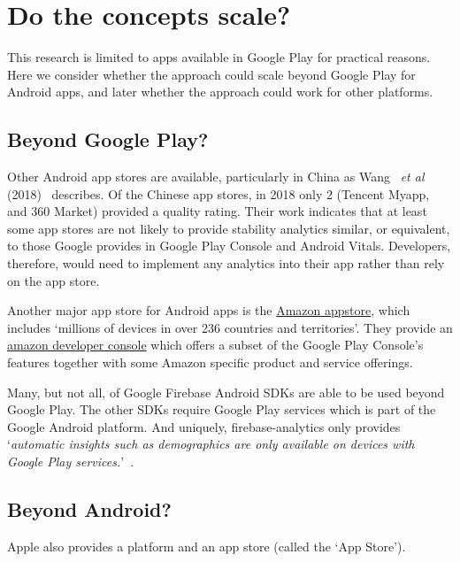 \section{Do the concepts scale?}
This research is limited to apps available in Google Play for practical reasons. Here we consider whether the approach could scale beyond Google Play for Android apps, and later whether the approach could work for other platforms.

\subsection{Beyond Google Play?}
Other Android app stores are available, particularly in China as Wang ~\emph{et al} (2018)~\cite{wang2018_beyond_google_play} describes. Of the Chinese app stores, in 2018 only 2 (Tencent Myapp, and 360 Market) provided a quality rating. Their work indicates that at least some app stores are not likely to provide stability analytics similar, or equivalent, to those Google provides in Google Play Console and Android Vitals. Developers, therefore, would need to implement any analytics into their app rather than rely on the app store. 

Another major app store for Android apps is the \href{https://developer.amazon.com/apps-and-games}{Amazon appstore}, which includes `millions of devices in over 236 countries and territories'. They provide an \href{https://developer.amazon.com/settings/console/home}{amazon developer console} which offers a subset of the Google Play Console's features together with some Amazon specific product and service offerings. 

Many, but not all, of Google Firebase Android SDKs are able to be used beyond Google Play. The other SDKs require Google Play services which is part of the Google Android platform. And uniquely, firebase-analytics only provides `\emph{automatic insights such as demographics are only available on devices with Google Play services.}'~\citep{firebasesupport2020_dependencies_of_firebase_sdks_on_google_play_services}. 



\subsection{Beyond Android?}


Apple also provides a platform and an app store (called the `App Store'). 

